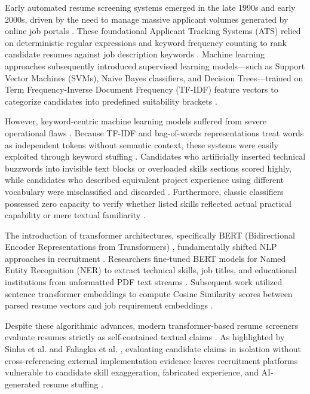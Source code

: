 Early automated resume screening systems emerged in the late 1990s and early 2000s, driven by the need to manage massive applicant volumes generated by online job portals \cite{ref1, ref7}. These foundational Applicant Tracking Systems (ATS) relied on deterministic regular expressions and keyword frequency counting to rank candidate resumes against job description keywords \cite{ref50, ref8}. Machine learning approaches subsequently introduced supervised learning models—such as Support Vector Machines (SVMs), Naive Bayes classifiers, and Decision Trees—trained on Term Frequency-Inverse Document Frequency (TF-IDF) feature vectors to categorize candidates into predefined suitability brackets \cite{ref7, ref13}.

However, keyword-centric machine learning models suffered from severe operational flaws \cite{ref9}. Because TF-IDF and bag-of-words representations treat words as independent tokens without semantic context, these systems were easily exploited through keyword stuffing \cite{ref10, ref19}. Candidates who artificially inserted technical buzzwords into invisible text blocks or overloaded skills sections scored highly, while candidates who described equivalent project experience using different vocabulary were misclassified and discarded \cite{ref11, ref12}. Furthermore, classic classifiers possessed zero capacity to verify whether listed skills reflected actual practical capability or mere textual familiarity \cite{ref2, ref3}.

The introduction of transformer architectures, specifically BERT (Bidirectional Encoder Representations from Transformers) \cite{ref12}, fundamentally shifted NLP approaches in recruitment \cite{ref11}. Researchers fine-tuned BERT models for Named Entity Recognition (NER) to extract technical skills, job titles, and educational institutions from unformatted PDF text streams \cite{ref9, ref19}. Subsequent work utilized sentence transformer embeddings to compute Cosine Similarity scores between parsed resume vectors and job requirement embeddings \cite{ref41, ref8}.

Despite these algorithmic advances, modern transformer-based resume screeners evaluate resumes strictly as self-contained textual claims \cite{ref23, ref19}. As highlighted by Sinha et al. \cite{ref8} and Faliagka et al. \cite{ref7}, evaluating candidate claims in isolation without cross-referencing external implementation evidence leaves recruitment platforms vulnerable to candidate skill exaggeration, fabricated experience, and AI-generated resume stuffing \cite{ref4, ref5, ref17}.

